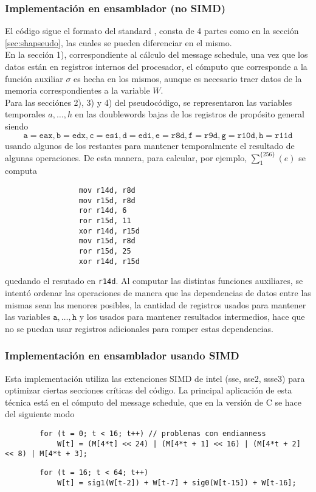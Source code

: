 \subsubsection{Implementación en ensamblador (no SIMD)}
El código sigue el formato del standard \cite{Fips}, consta de 4 partes como en la sección \ref{sec:shapseudo}, las cuales se pueden diferenciar en el mismo. \\
\indent En la sección 1), correspondiente al cálculo del message schedule, una vez que los datos están en registros internos del procesador, el cómputo que corresponde a la función auxiliar $\sigma$ es hecha en los mismos, aunque es necesario traer datos de la memoria correspondientes a la variable $W$. \\
\indent Para las secciónes 2), 3) y 4) del pseudocódigo, se representaron las variables temporales $a, \dots, h$ en las doublewords bajas de los registros de propósito general siendo $$\texttt{a} = \texttt{eax}, \texttt{b} = \texttt{edx}, \texttt{c} = \texttt{esi}, \texttt{d} = \texttt{edi}, \texttt{e} = \texttt{r8d}, \texttt{f} = \texttt{r9d}, \texttt{g} = \texttt{r10d}, \texttt{h} = \texttt{r11d}  $$ usando algunos de los restantes para mantener temporalmente el resultado de algunas operaciones. De esta manera, para calcular, por ejemplo, $\sum^{\{256\}}_1(e)$ se computa 
\begin{verbatim}
                 mov r14d, r8d
                 mov r15d, r8d
                 ror r14d, 6
                 ror r15d, 11
                 xor r14d, r15d
                 mov r15d, r8d
                 ror r15d, 25
                 xor r14d, r15d
\end{verbatim}

quedando el resutado en \texttt{r14d}. Al computar las distintas funciones auxiliares, se intentó ordenar las operaciones de manera que las dependencias de datos entre las mismas sean las menores posibles, la cantidad de registros usados para mantener las variables $ \texttt{a}, \dots, \texttt{h} $ y los usados para mantener resultados intermedios, hace que no se puedan usar registros adicionales para romper estas dependencias.

\subsubsection{Implementación en ensamblador usando SIMD}
\label{sec:shaimpSIMD}
Esta implementación utiliza las extenciones SIMD de intel (sse, sse2, ssse3) para optimizar ciertas secciones críticas del código. La principal aplicación de esta técnica está en el cómputo del message schedule, que en la versión de C se hace del siguiente modo
\begin{verbatim} 
        for (t = 0; t < 16; t++) // problemas con endianness                                                 
            W[t] = (M[4*t] << 24) | (M[4*t + 1] << 16) | (M[4*t + 2] << 8) | M[4*t + 3];
\end{verbatim}
\begin{verbatim} 
        for (t = 16; t < 64; t++)
            W[t] = sig1(W[t-2]) + W[t-7] + sig0(W[t-15]) + W[t-16];
\end{verbatim}

